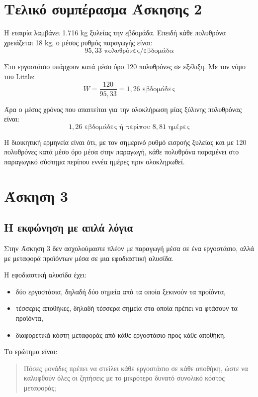 \documentclass[12pt,a4paper]{article}
\begin{document}
\section{Τελικό συμπέρασμα Άσκησης 2}

Η εταιρία λαμβάνει 1.716 kg ξυλείας την εβδομάδα. Επειδή κάθε πολυθρόνα χρειάζεται 18 kg, ο μέσος ρυθμός παραγωγής είναι:
\[
95{,}33 \text{ πολυθρόνες/εβδομάδα}
\]

Στο εργοστάσιο υπάρχουν κατά μέσο όρο 120 πολυθρόνες σε εξέλιξη. Με τον νόμο του Little:
\[
W=\frac{120}{95{,}33}=1{,}26 \text{ εβδομάδες}
\]

Άρα ο μέσος χρόνος που απαιτείται για την ολοκλήρωση μίας ξύλινης πολυθρόνας είναι:
\[
\boxed{1{,}26 \text{ εβδομάδες ή περίπου } 8{,}81 \text{ ημέρες}}
\]

Η διοικητική ερμηνεία είναι ότι, με τον σημερινό ρυθμό εισροής ξυλείας και με 120 πολυθρόνες κατά μέσο όρο μέσα στην παραγωγή, κάθε πολυθρόνα παραμένει στο παραγωγικό σύστημα περίπου εννέα ημέρες πριν ολοκληρωθεί.

\newpage

\section{Άσκηση 3}

\subsection{Η εκφώνηση με απλά λόγια}

Στην Άσκηση 3 δεν ασχολούμαστε πλέον με παραγωγή μέσα σε ένα εργοστάσιο, αλλά με μεταφορά προϊόντων μέσα σε μια εφοδιαστική αλυσίδα.

Η εφοδιαστική αλυσίδα έχει:

\begin{itemize}
    \item δύο εργοστάσια, δηλαδή δύο σημεία από τα οποία ξεκινούν τα προϊόντα,
    \item τέσσερις αποθήκες, δηλαδή τέσσερα σημεία στα οποία πρέπει να φτάσουν τα προϊόντα,
    \item διαφορετικά κόστη μεταφοράς από κάθε εργοστάσιο προς κάθε αποθήκη.
\end{itemize}

Το ερώτημα είναι:

\begin{quote}
Πόσες μονάδες πρέπει να στείλει κάθε εργοστάσιο σε κάθε αποθήκη, ώστε να καλυφθούν όλες οι ζητήσεις με το μικρότερο δυνατό συνολικό κόστος μεταφοράς;
\end{quote}
\end{document}
